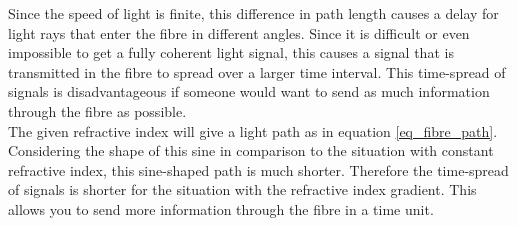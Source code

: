 \documentclass{article}
\begin{document}
Since the speed of light is finite, this difference in path length causes a delay for light rays that enter the fibre in different angles. Since it is difficult or even impossible to get a fully coherent light signal, this causes a signal that is transmitted in the fibre to spread over a larger time interval. This time-spread of signals is disadvantageous if someone would want to send as much information through the fibre as possible. \\
The given refractive index will give a light path as in equation \ref{eq_fibre_path}. Considering the shape of this sine in comparison to the situation with constant refractive index, this sine-shaped path is much shorter. Therefore the time-spread of signals is shorter for the situation with the refractive index gradient. This allows you to send more information through the fibre in a time unit.
\end{document}

